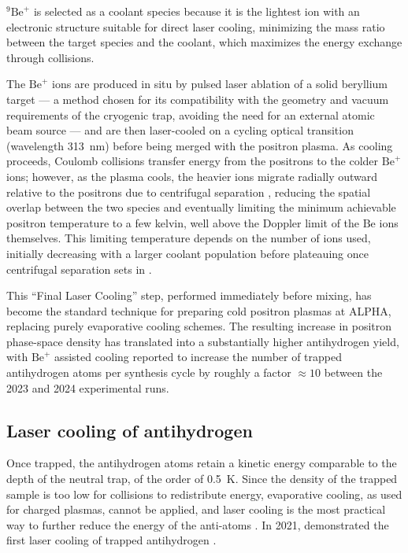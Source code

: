 $^{9}\text{Be}^{+}$ is selected as a coolant species because it is the lightest ion with an electronic structure suitable for direct laser cooling, minimizing the mass ratio between the target species and the coolant, which maximizes the energy exchange through collisions.

The $\text{Be}^{+}$ ions are produced in situ by pulsed laser ablation of a solid beryllium target — a method chosen for its compatibility with the geometry and vacuum requirements of the cryogenic trap, avoiding the need for an external atomic beam source — and are then laser-cooled on a cycling optical transition (wavelength \SI{313}{\nano \meter}) before being merged with the positron plasma. As cooling proceeds, Coulomb collisions transfer energy from the positrons to the colder $\text{Be}^+$ ions; however, as the plasma cools, the heavier ions migrate radially outward relative to the positrons due to centrifugal separation \cite{ONeil:1981cent}, reducing the spatial overlap between the two species and eventually limiting the minimum achievable positron temperature to a few kelvin, well above the Doppler limit of the $\text{Be}$ ions themselves. This limiting temperature depends on the number of ions used, initially decreasing with a larger coolant population before plateauing once centrifugal separation sets in \cite{Andresen:2011cent}.

This ``Final Laser Cooling'' step, performed immediately before mixing, has become the standard technique for preparing cold positron plasmas at ALPHA, replacing purely evaporative cooling schemes. The resulting increase in positron phase-space density has translated into a substantially higher antihydrogen yield, with $\text{Be}^{+}$ assisted cooling reported to increase the number of trapped antihydrogen atoms per synthesis cycle by roughly a factor $\approx 10$ between the 2023 and 2024 experimental runs.

\subsection{Laser cooling of antihydrogen} \label{sec:lasercooling}

Once trapped, the antihydrogen atoms retain a kinetic energy comparable to the depth of the neutral trap, of the order of \SI{0.5}{\kelvin}. Since the density of the trapped sample is too low for collisions to redistribute energy, evaporative cooling, as used for charged plasmas, cannot be applied, and laser cooling is the most practical way to further reduce the energy of the anti-atoms \cite{Evans:2022thesis}. In 2021, \ALPHA demonstrated the first laser cooling of trapped antihydrogen \cite{Baker:2021ncj}.

